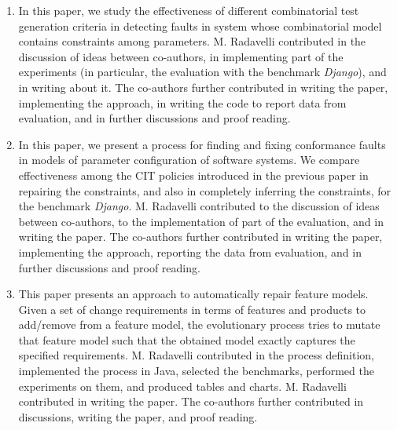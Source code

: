 \begin{enumerate}
	\renewcommand{\theenumi}{\Alph{enumi}} %
	\item \cite{Gargantini16:validation} 
	
	In this paper, we study the effectiveness of different combinatorial test generation criteria in detecting faults in system whose combinatorial model contains constraints among parameters.
	M. Radavelli contributed in the discussion of ideas between co-authors, in implementing part of the experiments (in particular, the evaluation with the benchmark \textit{Django}), and in writing about it.
	The co-authors further contributed in writing the paper, implementing the approach, in writing the code to report data from evaluation, and in further discussions and proof reading.

	\item \cite{gargantini_combinatorial_2017} 

	In this paper, we present a process for finding and fixing conformance faults in models of parameter configuration of software systems. We compare effectiveness among the CIT policies introduced in the previous paper \cite{Gargantini16:validation} in repairing the constraints, and also in completely inferring the constraints, for the benchmark \textit{Django}.
	M. Radavelli contributed to the discussion of ideas between co-authors, to the implementation of part of the evaluation, and in writing the paper.
	The co-authors further contributed in writing the paper, implementing the approach, reporting the data from evaluation, and in further discussions and proof reading.
		
	\item \cite{arcaini_evolutionary_2018} 
	
	This paper presents an approach to automatically repair feature models. Given a set of change requirements in terms of features and products to add/remove from a feature model, the evolutionary process tries to mutate that feature model such that the obtained model exactly captures the specified requirements.
	M. Radavelli contributed in the process definition, implemented the process in Java, selected the benchmarks, performed the experiments on them, and produced tables and charts. M. Radavelli contributed in writing the paper.
	The co-authors further contributed in discussions, writing the paper, and proof reading.


\end{enumerate}
